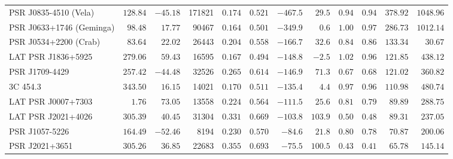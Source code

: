 \documentclass[useAMS,usenatbib]{mn2e}
\begin{document}
\begin{table}
\begin{tabular}{lrrrrrrrrrrr}
PSR J0835-4510 (Vela)     & $128.84$ & $-45.18$ & 171821 & $0.174$ & $0.521$ & $-467.5$ & $  29.5$ & $0.94$  & $0.94$ & $   378.92$ & $  1048.96$  \\ 
PSR J0633+1746 (Geminga)  & $ 98.48$ & $ 17.77$ &  90467 & $0.164$ & $0.501$ & $-349.9$ & $   0.6$ & $1.00$  & $0.97$ & $   286.73$ & $  1012.14$  \\ 
PSR J0534+2200 (Crab)     & $ 83.64$ & $ 22.02$ &  26443 & $0.204$ & $0.558$ & $-166.7$ & $  32.6$ & $0.84$  & $0.86$ & $   133.34$ & $    30.67$  \\ 
  LAT PSR J1836+5925      & $279.06$ & $ 59.43$ &  16595 & $0.167$ & $0.494$ & $-148.8$ & $  -2.5$ & $1.02$  & $0.96$ & $   121.85$ & $   438.12$  \\ 
      PSR J1709-4429      & $257.42$ & $-44.48$ &  32526 & $0.265$ & $0.614$ & $-146.9$ & $  71.3$ & $0.67$  & $0.68$ & $   121.02$ & $   360.82$  \\ 
            3C 454.3      & $343.50$ & $ 16.15$ &  14021 & $0.170$ & $0.511$ & $-135.4$ & $   4.4$ & $0.97$  & $0.96$ & $   110.98$ & $   480.74$  \\ 
  LAT PSR J0007+7303      & $  1.76$ & $ 73.05$ &  13558 & $0.224$ & $0.564$ & $-111.5$ & $  25.6$ & $0.81$  & $0.79$ & $    89.89$ & $   288.75$  \\ 
  LAT PSR J2021+4026      & $305.39$ & $ 40.45$ &  31304 & $0.331$ & $0.669$ & $-103.8$ & $ 103.9$ & $0.50$  & $0.48$ & $    89.31$ & $   237.05$  \\ 
      PSR J1057-5226      & $164.49$ & $-52.46$ &   8194 & $0.230$ & $0.570$ & $ -84.6$ & $  21.8$ & $0.80$  & $0.78$ & $    70.87$ & $   200.06$  \\ 
      PSR J2021+3651      & $305.26$ & $ 36.85$ &  22683 & $0.355$ & $0.693$ & $ -75.5$ & $ 100.5$ & $0.43$  & $0.41$ & $    65.78$ & $   145.14$  \\ 



\end{tabular}
\end{table}
\end{document}
